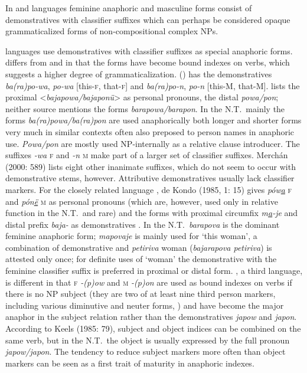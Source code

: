 \documentclass[output=collectionpaper]{langsci/langscibook}
\begin{document}
In  and  languages feminine anaphoric and masculine forms consist of demonstratives with classifier suffixes which can perhaps be considered opaque grammaticalized forms of non-compositional complex NPs.

 languages use demonstratives with classifier suffixes as special anaphoric forms.  differs from  and  in that the forms have become bound indexes on verbs, which suggests a higher degree of grammaticalization.  () has the demonstratives \textit{ba(ra)po-wa}, \textit{po-wa} [this-\textsc{f}, that-\textsc{f}] and \textit{ba(ra)po-n}, \textit{po-n} [this-M, that-M]. \citet[237]{Machal2000} lists the proximal <\textit{bajapowa/bajaponü}> as personal pronouns, \citet[589]{Merchan2000} the distal \textit{powa/pon}; neither source mentions the forms \textit{barapowa/barapon}.
In the N.T.\ mainly the forms \textit{ba(ra)powa/ba(ra)pon} are used anaphorically \textendash{} both longer and shorter forms very much in similar contexts \textendash{} often also preposed to person names in anaphoric use. \textit{Powa/pon} are mostly used NP-internally as a relative clause introducer. The suffixes \textit{-wa} \textsc{f} and \textit{-n} \textsc{m} make part of a larger set of classifier suffixes. Merchán (2000: 589) lists eight other inanimate suffixes, which do not seem to occur with demonstrative stems, however. Attributive demonstratives usually lack classifier markers. For the closely related language , de Kondo (1985, 1: 15) gives \textit{pów\underline{a}}
\textsc{f} and \textit{pón\underline{ë}} \textsc{m} as personal pronouns (which are, however, used only in relative function in the N.T.\ and rare) and the forms with proximal circumfix \textit{m\underline{a}-je} and distal prefix \textit{baja-} as demonstratives \citep[2: 49]{Kondo1985}. In the N.T.\ \textit{barapova} is the dominant feminine anaphoric form; \textit{mapovaje} is mainly used for ‘this woman’, a combination of demonstrative and \textit{petiriva} woman (\textit{bajarapova petiriva}) is attested only once; for definite uses of ‘woman’ the demonstrative with the feminine classifier suffix is preferred in proximal or distal form. , a third  language, is different in that \textsc{f} \textit{-(p)ow} and \textsc{m} \textit{-(p)on} are used as bound indexes on verbs if there is no NP subject (they are two of at least nine third person markers, including various diminutive and neuter forms, \citealt[][79, 86]{Keels1985}) and have become the major anaphor in the subject relation rather than the demonstratives \textit{japow} and \textit{japon}. According to Keels (1985: 79), subject and object indices can be combined on the same verb, but in the N.T.\ the object is usually expressed by the full pronoun \textit{japow/japon}. The tendency to reduce subject markers more often than object markers can be seen as a first trait of maturity in  anaphoric indexes.
\end{document}
